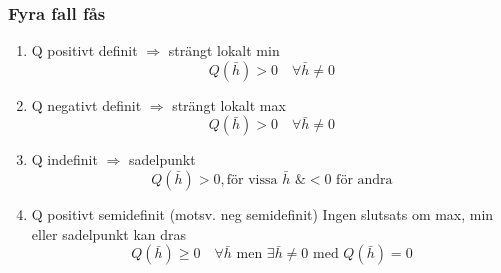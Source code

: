 \documentclass{article}
\begin{document}
\subsubsection{Fyra fall fås}
\begin{enumerate}
\item Q positivt definit $\Rightarrow$ strängt lokalt min
$$
	Q(\bar{h}) > 0 \quad\forall \bar{h} \neq 0
$$
\item Q negativt definit $\Rightarrow$ strängt lokalt max
$$
	Q(\bar{h}) > 0 \quad\forall \bar{h} \neq 0
$$
\item Q indefinit $\Rightarrow$ sadelpunkt
$$
	Q(\bar{h}) > 0 , \text{för vissa } \bar{h} \text{ \& } < 0 \text{ för andra}
$$
\item Q positivt semidefinit (motsv. neg semidefinit) 
Ingen slutsats om max, min eller sadelpunkt kan dras
$$
	Q(\bar{h}) \geq 0 \quad\forall \bar{h} \text{ men } \exists\bar{h} \neq 0 \text{ med } Q(\bar{h}) = 0
$$
\end{enumerate}

\newpage
\end{document}
